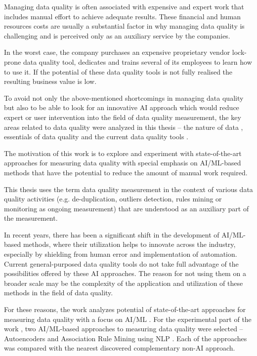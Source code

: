 \label{Introduction}

	Managing data quality is often associated with expensive and expert work that includes manual effort to achieve adequate results. These financial and human resources costs are usually a substantial factor in why managing data quality is challenging and is perceived only as an auxiliary service by the companies.
	
	In the worst case, the company purchases an expensive proprietary vendor lock-prone data quality tool, dedicates and trains several of its employees to learn how to use it. If the potential of these data quality tools is not fully realised the resulting business value is low.
	
	To avoid not only the above-mentioned shortcomings in managing data quality but also to be able to look for an innovative AI approach which would reduce expert or user intervention into the field of data quality measurement, the key areas related to data quality were analyzed in this thesis -- the nature of data , essentials of data quality  and the current data quality tools .

	The motivation of this work is to explore and experiment with state-of-the-art approaches for measuring data quality with special emphasis on AI/ML-based methods that have the potential to reduce the amount of manual work required.
	
	This thesis uses the term data quality measurement in the context of various data quality activities (e.g. de-duplication, outliers detection, rules mining or monitoring as ongoing measurement) that are understood as an auxiliary part of the measurement. 
	
	In recent years, there has been a significant shift in the development of AI/ML-based methods, where their utilization helps to innovate across the industry, especially by shielding from human error and implementation of automation. Current general-purposed data quality tools do not take full advantage of the possibilities offered by these AI approaches. The reason for not using them on a broader scale may be the complexity of the application and utilization of these methods in the field of data quality.  
	
	For these reasons, the work analyzes potential of state-of-the-art approaches for measuring data quality with a focus on AI/ML . For the experimental part of the work , two AI/ML-based approaches to measuring data quality were selected -- Autoencoders  and Association Rule Mining using NLP . Each of the approaches was compared with the nearest discovered complementary non-AI approach.
